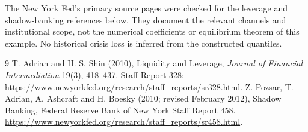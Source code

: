 \documentclass[11pt]{article}
\theoremstyle{remark}\newtheorem{remark}[theorem]{Remark}
\begin{document}
The New York Fed's primary source pages were checked for the leverage and shadow-banking references below. They document the relevant channels and institutional scope, not the numerical coefficients or equilibrium theorem of this example. No historical crisis loss is inferred from the constructed quantiles.
\begin{thebibliography}{9}
 T. Adrian and H. S. Shin (2010), Liquidity and Leverage, \emph{Journal of Financial Intermediation} 19(3), 418--437. Staff Report 328: \url{https://www.newyorkfed.org/research/staff_reports/sr328.html}.
 Z. Pozsar, T. Adrian, A. Ashcraft and H. Boesky (2010; revised February 2012), Shadow Banking, Federal Reserve Bank of New York Staff Report 458. \url{https://www.newyorkfed.org/research/staff_reports/sr458.html}.
\end{thebibliography}
\end{document}
